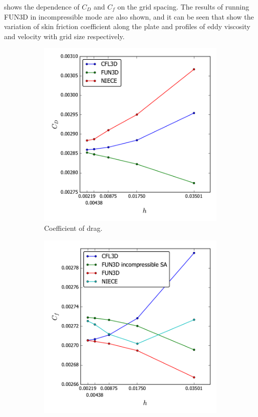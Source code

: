  shows the dependence of $C_D$ and $C_f$ on the grid spacing.  The results of running FUN3D in incompressible mode are also shown, and it can be seen that   show the variation of skin friction coefficient along the plate and profiles of eddy viscosity and velocity with grid size respectively. 
\begin{figure}[ht!]
\centering
\begin{subfigure}{.45\textwidth}
  \centering
  \includegraphics[width=1.0\textwidth]{figs/flatnx/cd_convergence.pdf}
  \caption{Coefficient of drag.}
\end{subfigure}%
\begin{subfigure}{.45\textwidth}
  \centering
  \includegraphics[width=1.0\textwidth]{figs/flatnx/cf_convergence.pdf}

\end{subfigure}
\end{figure}
